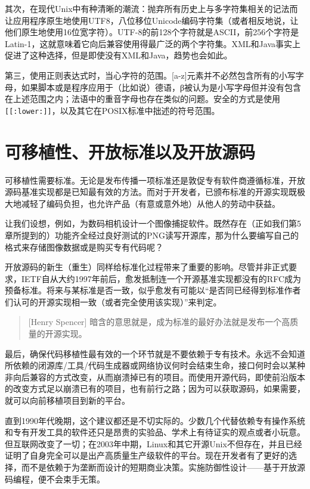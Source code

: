 \documentclass[12pt,oneside]{book}
\begin{document}
其次，在现代Unix中有种清晰的潮流：抛弃所有历史上与多字符集相关的记法而让应用程序原生地使用UTF8，八位移位Unicode编码字符集（或者相反地说，让他们原生地使用16位宽字符）。UTF-8的前128个字符就是ASCII，前256个字符是Latin-1，这就意味着它向后兼容使用得最广泛的两个字符集。XML和Java事实上促进了这种选择，但是即使没有XML和Java，趋势也会如此。

第三，使用正则表达式时，当心字符的范围。[a-z]元素并不必然包含所有的小写字母，如果脚本或是程序应用于（比如说）德语，β被认为是小写字母但并没有包含在上述范围之内；法语中的重音字母也存在类似的问题。安全的方式是使用\verb+[[:lower:]]+，以及其它在POSIX标准中拙述的符号范围。

\section{可移植性、开放标准以及开放源码}
可移植性需要标准。无论是发布传播一项标准还是敦促专有软件商遵循标准，开放源码基准实现都是已知最有效的方法。而对于开发者，已颁布标准的开源实现既极大地减轻了编码负担，也允许产品（有意或意外地）从他人的劳动中获益。

让我们设想，例如，为数码相机设计一个图像捕捉软件。既然存在（正如我们第5章所提到的）功能齐全经过良好测试的PNG读写开源库，那为什么要编写自己的格式来存储图像数据或是购买专有代码呢？

开放源码的新生（重生）同样给标准化过程带来了重要的影响。尽管并非正式要求，IETF自从大约1997年前后，愈发抵制连一个开源基准实现都没有的RFC成为预备标准。将来与某标准是否一致，似乎愈发有可能以“是否同已经得到标准作者们认可的开源实现相一致（或者完全使用该实现）”来判定。

\begin{quote}[Henry Spencer]
暗含的意思就是，成为标准的最好办法就是发布一个高质量的开源实现。
\end{quote}

最后，确保代码移植性最有效的一个环节就是不要依赖于专有技术。永远不会知道所依赖的闭源库/工具/代码生成器或网络协议何时会结束生命，接口何时会以某种非向后兼容的方式改变，从而崩溃掉已有的项目。而使用开源代码，即使前沿版本的改变方式足以崩溃已有的项目，也有前行之路；因为可以获取源码，如果需要，就可以向前移植项目到新的平台。

直到1990年代晚期，这个建议都还是不切实际的。少数几个代替依赖专有操作系统和专有开发工具的软件还只是昂贵的实验品、学术上有待证实的观点或者小玩意。但互联网改变了一切；在2003年中期，Linux和其它开源Unix不但存在，并且已经证明了自身完全可以是出产高质量生产级软件的平台。现在开发者有了更好的选择，而不是依赖于为垄断而设计的短期商业决策。实施防御性设计——基于开放源码编程，便不会束手无策。
\end{document}
